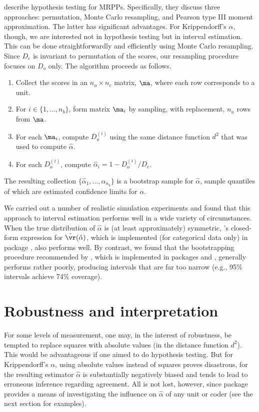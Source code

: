 \citeauthor{permutation} describe hypothesis testing for MRPPs. Specifically, they discuss three approaches: permutation, Monte Carlo resampling, and Pearson type III moment approximation. The latter has significant advantages. For Krippendorff's $\alpha$, though, we are interested not in hypothesis testing but in interval estimation. This can be done straightforwardly and efficiently using Monte Carlo resampling. Since $D_e$ is invariant to permutation of the scores, our resampling procedure focuses on $D_o$ only. The algorithm proceeds as follows.
\begin{enumerate}
\item Collect the scores in an $n_u\times n_c$ matrix, $\ma$, where each row corresponds to a unit.
\item For $i\in\{1,\dots,n_b\}$, form matrix $\ma_i$ by sampling, with replacement, $n_u$ rows from $\ma$.
\item For each $\ma_i$, compute $D_o^{(i)}$ using the same distance function $d^2$ that was used to compute $\hat{\alpha}$.
\item For each $D_o^{(i)}$, compute $\hat{\alpha}_i=1-D_o^{(i)}/D_e$.
\end{enumerate}
The resulting collection $\{\hat{\alpha}_1,\dots,\hat{\alpha}_{n_b}\}$ is a bootstrap sample for $\hat{\alpha}$, sample quantiles of which are estimated confidence limits for $\alpha$.

We carried out a number of realistic simulation experiments and found that this approach to interval estimation performs well in a wide variety of circumstances. When the true distribution of $\hat{\alpha}$ is (at least approximately) symmetric, \citeauthor{gwet2015}'s closed-form expression for $\hat{\vr}(\hat{\alpha})$, which is implemented (for categorical data only) in package , also performs well. By contrast, we found that the bootstrapping procedure recommended by \citet{alphaboot}, which is implemented in packages  and , generally performs rather poorly, producing intervals that are far too narrow (e.g., 95\% intervals achieve 74\% coverage). 

\section{Robustness and interpretation}
\label{robust}

For some levels of measurement, one may,  in the interest of robustness, be tempted to replace squares with absolute values (in the distance function $d^2$). This would be advantageous if one aimed to do hypothesis testing. But for Krippendorff's $\alpha$, using absolute values instead of squares proves disastrous, for the resulting estimator $\hat{\alpha}$ is substantially negatively biased and tends to lead to erroneous inference regarding agreement. All is not lost, however, since package  provides a means of investigating the influence on $\hat{\alpha}$ of any unit or coder (see the next section for examples).

